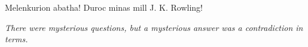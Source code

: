 Melenkurion abatha! Duroc minas mill J. K. Rowling!

\emph{There were mysterious questions, but a mysterious answer was a
contradiction in terms.}

